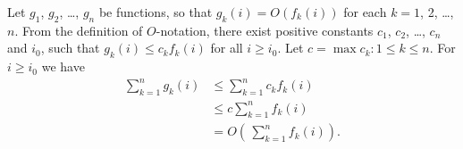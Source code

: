 Let $g_1$, $g_2$, \dots, $g_n$ be functions, so that $g_k(i)=O(f_k(i))$ for each $k=1$, 2, \dots, $n$.
From the definition of $O$-notation, there exist positive constants $c_1$, $c_2$, \dots, $c_n$ and $i_0$, such that $g_k(i)\le c_kf_k(i)$ for all $i\ge i_0$.
Let $c=\max{c_k:1\le k\le n}$.
For $i\ge i_0$ we have
\begin{align*}
    \sum_{k=1}^ng_k(i) &\le \sum_{k=1}^nc_kf_k(i) \\
    &\le c\sum_{k=1}^nf_k(i) \\
    &= O\left(\,\sum_{k=1}^nf_k(i)\right).
\end{align*}
